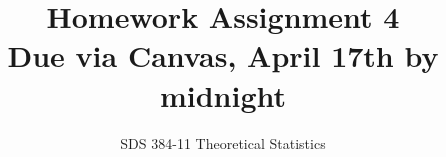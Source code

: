 \documentclass[11pt]{article}
\begin{document}
\title{{\bf Homework Assignment 4}\\Due via Canvas, April 17th by midnight}
\author{SDS 384-11 Theoretical Statistics}

\date{}

\maketitle{}
\begin{enumerate}%


\end{enumerate}
\end{document}
